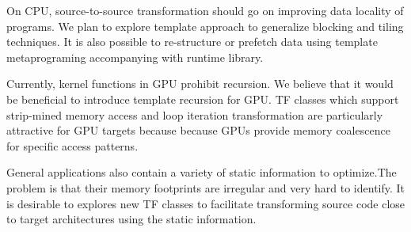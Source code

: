 On CPU, source-to-source transformation should go on improving data
locality of programs. We plan to explore template approach to  generalize
blocking and tiling techniques.  It is also possible to re-structure
or prefetch data using template metaprograming accompanying with
runtime library.

Currently, kernel functions in GPU prohibit recursion. We believe that
it would be beneficial to introduce template recursion for GPU. TF classes which support strip-mined memory access and loop iteration transformation are
particularly attractive for GPU targets because because GPUs
provide memory coalescence for specific access patterns.


General applications also contain a variety of static information to
optimize.The problem is that their memory footprints are irregular and
very hard to identify. It is desirable to explores new TF classes to facilitate
transforming source code close to target architectures using the static
information.
